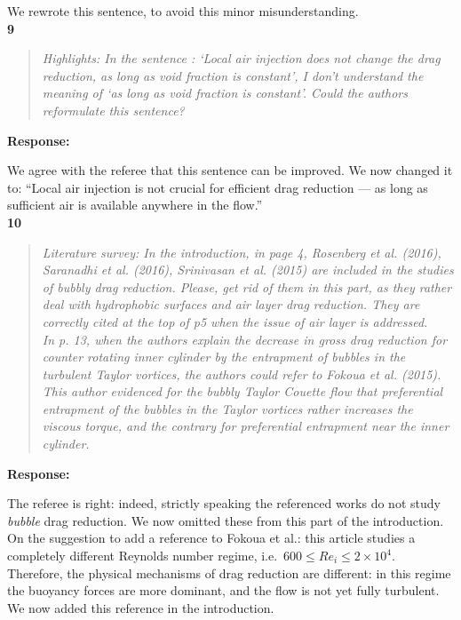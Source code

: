 \documentclass[10pt]{article}
\newcommand{\strong}[1]{\textbf{#1}}
\newcommand{\question}[1]{\begin{quote} \emph{#1}  \end{quote} }
\begin{document}
\noindent We rewrote this sentence, to avoid this minor misunderstanding.\\

\noindent \strong{9}

\question{Highlights: In the sentence : `Local air injection does not change the drag reduction, as long as void fraction is constant', I don't understand the meaning of `as long as void fraction is constant'. Could the authors reformulate this sentence?
}

\noindent \strong{Response:} 

\noindent We agree with the referee that this sentence can be improved. We now changed it to: ``Local air injection is not crucial for efficient drag reduction --- as long as sufficient air is available anywhere in the flow.''\\

\noindent \strong{10}

\question{Literature survey: In the introduction, in page 4, Rosenberg et al. (2016), Saranadhi et al. (2016), Srinivasan et al. (2015) are included in the studies of bubbly drag reduction. Please, get rid of them in this part, as they rather deal with hydrophobic surfaces and air layer drag reduction. They are correctly cited at the top of p5 when the issue of air layer is addressed. \\
In p. 13, when the authors explain the decrease in gross drag reduction for counter rotating inner cylinder by the entrapment of bubbles in the turbulent Taylor vortices, the authors could refer to Fokoua et al. (2015). This author evidenced for the bubbly Taylor Couette flow that preferential entrapment of the bubbles in the Taylor vortices rather increases the viscous torque, and the contrary for preferential entrapment near the inner cylinder. }

\noindent \strong{Response:} 

\noindent The referee is right: indeed, strictly speaking the referenced works do not study \emph{bubble} drag reduction. We now omitted these from this part of the introduction. \\
On the suggestion to add a reference to Fokoua et al.: this article studies a completely different Reynolds number regime, i.e.\ $600 \leq Re_i \leq 2\times 10^4$. Therefore, the physical mechanisms of drag reduction are different: in this regime the buoyancy forces are more dominant, and the flow is not yet fully turbulent. We now added this reference in the introduction.\\
\end{document}
